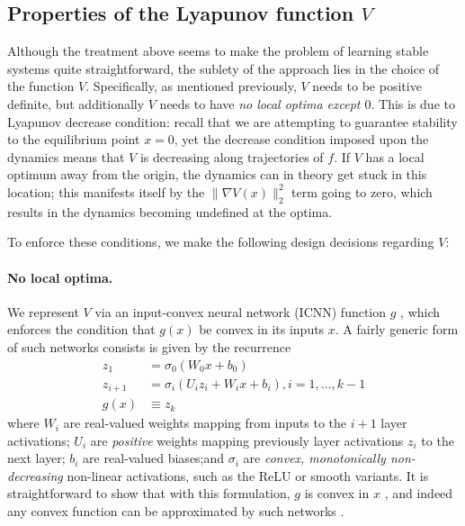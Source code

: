 \subsection{Properties of the Lyapunov function $V$}\label{sec:lyapunov_properties}

Although the treatment above seems to make the problem of learning stable systems quite straightforward, the sublety of the approach lies in the choice of the function $V$.  Specifically, as mentioned previously, $V$ needs to be positive definite, but additionally $V$ needs to have \emph{no local optima except $0$}.   This is due to Lyapunov decrease condition: recall that we are attempting to guarantee stability to the equilibrium point $x=0$, yet the decrease condition imposed upon the dynamics means that $V$ is decreasing along trajectories of $f$.  If $V$ has a local optimum away from the origin, the dynamics can in theory get stuck in this location; this manifests itself by the $\|\nabla V(x)\|_2^2$ term going to zero, which results in the dynamics becoming undefined at the optima.

To enforce these conditions, we make the following design decisions regarding $V$:

\paragraph{No local optima.} We represent $V$ via an input-convex neural network (ICNN) function $g$ \citep{amos2017input}, which enforces the condition that $g(x)$ be convex in its inputs $x$.  A fairly generic form of such networks consists is given by the recurrence
\begin{equation}
    \begin{split}
        z_1 & = \sigma_0(W_0 x + b_0) \\
        z_{i+1} & = \sigma_i(U_i z_i + W_i x + b_i), i=1,\ldots,k-1 \\
        g(x) & \equiv z_k
    \end{split}
\end{equation}
where $W_i$ are real-valued weights mapping from inputs to the $i+1$ layer activations; $U_i$ are \emph{positive} weights mapping previously layer activations $z_i$ to the next layer;  $b_i$ are real-valued biases;and $\sigma_i$ are \emph{convex, monotonically non-decreasing} non-linear activations, such as the ReLU or smooth variants.  It is straightforward to show that with this formulation, $g$ is convex in $x$ \citep{amos2017input}, and indeed any convex function can be approximated by such networks \citep{chen2018optimal}.

